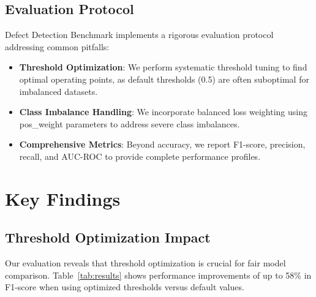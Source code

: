 \documentclass[letterpaper]{article}
\begin{document}
\subsection{Evaluation Protocol}
Defect Detection Benchmark implements a rigorous evaluation protocol addressing common pitfalls:

\begin{itemize}
	\item \textbf{Threshold Optimization}: We perform systematic threshold tuning to find optimal operating points, as default thresholds (0.5) are often suboptimal for imbalanced datasets.

	\item \textbf{Class Imbalance Handling}: We incorporate balanced loss weighting using pos\_weight parameters to address severe class imbalances.

	\item \textbf{Comprehensive Metrics}: Beyond accuracy, we report F1-score, precision, recall, and AUC-ROC to provide complete performance profiles.
\end{itemize}

\section{Key Findings}

\subsection{Threshold Optimization Impact}

Our evaluation reveals that threshold optimization is crucial for fair model comparison. Table~\ref{tab:results} shows performance improvements of up to 58\% in F1-score when using optimized thresholds versus default values.
\end{document}

